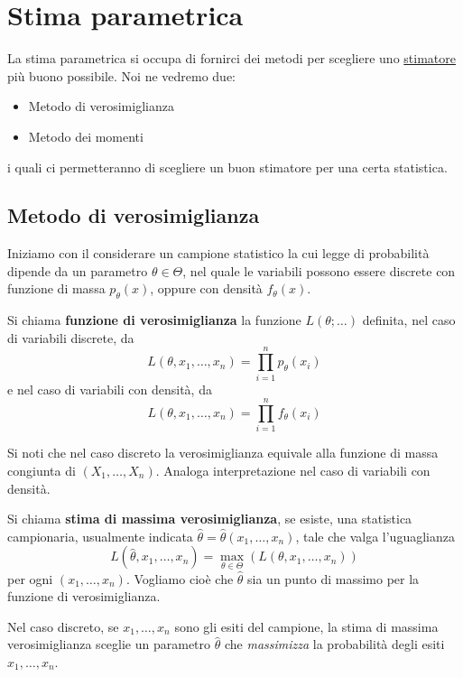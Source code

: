 \section{Stima parametrica}
La stima parametrica si occupa di fornirci dei metodi per scegliere uno
\hyperref[def: stimatore]{stimatore} più buono possibile. Noi ne vedremo due:
\begin{itemize}
	\item Metodo di verosimiglianza
	\item Metodo dei momenti
\end{itemize}
i quali ci permetteranno di scegliere un buon stimatore per una certa statistica.

\subsection{Metodo di verosimiglianza}
Iniziamo con il considerare un campione statistico la cui legge di probabilità dipende da un
parametro $\theta \in \Theta$, nel quale le variabili possono essere discrete con funzione di
massa $p_\theta(x)$, oppure con densità $f_\theta(x)$.

\begin{definition}
	Si chiama \textbf{funzione di verosimiglianza} la funzione $L(\theta; \dots)$ definita, nel
	caso di variabili discrete, da
	\[ L(\theta, x_1, \ldots, x_n) = \prod_{i=1}^n p_\theta(x_i) \]
	e nel caso di variabili con densità, da
	\[ L(\theta, x_1, \ldots, x_n) = \prod_{i=1}^n f_\theta(x_i) \]
\end{definition}

Si noti che nel caso discreto la verosimiglianza equivale alla funzione di massa congiunta di
$(X_1, \dots, X_n)$. Analoga interpretazione nel caso di variabili con densità.

\begin{definition}
	Si chiama \textbf{stima di massima verosimiglianza}, se esiste, una statistica campionaria,
	usualmente indicata $\hat{\theta} = \hat{\theta} (x_1, \dots, x_n)$, tale che valga
	l'uguaglianza
	\[
		L(\hat{\theta}, x_1, \dots, x_n) = \max_{\theta \in \Theta} (L(\theta, x_1, \dots, x_n))
	\]
	per ogni $(x_1, \dots, x_n)$. Vogliamo cioè che $\hat{\theta}$ sia un punto di massimo per
	la funzione di verosimiglianza.
\end{definition}

Nel caso discreto, se $x_1, \dots, x_n$ sono gli esiti del campione, la stima di massima
verosimiglianza sceglie un parametro $\hat{\theta}$ che \emph{massimizza} la probabilità degli
esiti $x_1, \dots, x_n$.

